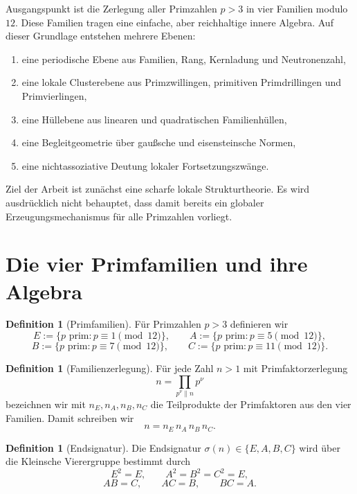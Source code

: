 \documentclass[12pt,a4paper]{article}
\theoremstyle{definition}
\newtheorem{definition}[satz]{Definition}
\theoremstyle{remark}
\newcommand{\signatur}{\sigma}
\begin{document}
	Ausgangspunkt ist die Zerlegung aller Primzahlen \(p>3\) in vier Familien modulo \(12\). Diese Familien tragen eine einfache, aber reichhaltige innere Algebra. Auf dieser Grundlage entstehen mehrere Ebenen:
	\begin{enumerate}[label=\arabic*.]
		\item eine periodische Ebene aus Familien, Rang, Kernladung und Neutronenzahl,
		\item eine lokale Clusterebene aus Primzwillingen, primitiven Primdrillingen und Primvierlingen,
		\item eine Hüllebene aus linearen und quadratischen Familienhüllen,
		\item eine Begleitgeometrie über gaußsche und eisensteinsche Normen,
		\item eine nichtassoziative Deutung lokaler Fortsetzungszwänge.
	\end{enumerate}
	
	Ziel der Arbeit ist zunächst eine scharfe lokale Strukturtheorie. Es wird ausdrücklich nicht behauptet, dass damit bereits ein globaler Erzeugungsmechanismus für alle Primzahlen vorliegt.
	
	\section{Die vier Primfamilien und ihre Algebra}
	
	\begin{definition}[Primfamilien]
		Für Primzahlen \(p>3\) definieren wir
		\[
		E:=\{p\text{ prim}:p\equiv 1\pmod{12}\},\qquad
		A:=\{p\text{ prim}:p\equiv 5\pmod{12}\},
		\]
		\[
		B:=\{p\text{ prim}:p\equiv 7\pmod{12}\},\qquad
		C:=\{p\text{ prim}:p\equiv 11\pmod{12}\}.
		\]
	\end{definition}
	
	\begin{definition}[Familienzerlegung]
		Für jede Zahl \(n>1\) mit Primfaktorzerlegung
		\[
		n=\prod_{p^\nu\parallel n} p^\nu
		\]
		bezeichnen wir mit \(n_E,n_A,n_B,n_C\) die Teilprodukte der Primfaktoren aus den vier Familien. Damit schreiben wir
		\[
		n=n_E\,n_A\,n_B\,n_C.
		\]
	\end{definition}
	
	\begin{definition}[Endsignatur]
		Die Endsignatur \(\signatur(n)\in\{E,A,B,C\}\) wird über die Kleinsche Vierergruppe bestimmt durch
		\[
		E^2=E,\qquad A^2=B^2=C^2=E,
		\]
		\[
		AB=C,\qquad AC=B,\qquad BC=A.
		\]
	\end{definition}
	
\end{document}
